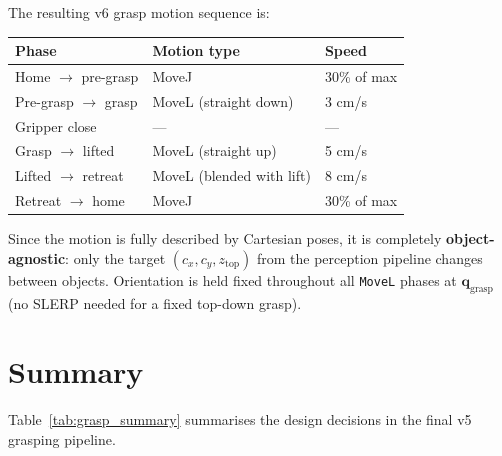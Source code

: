 The resulting v6 grasp motion sequence is:

\begin{center}
\begin{tabular}{lll}
\toprule
\textbf{Phase} & \textbf{Motion type} & \textbf{Speed} \\
\midrule
Home $\rightarrow$ pre-grasp  & MoveJ & 30\% of max \\
Pre-grasp $\rightarrow$ grasp & MoveL (straight down) & 3 cm/s \\
Gripper close                 & — & — \\
Grasp $\rightarrow$ lifted    & MoveL (straight up) & 5 cm/s \\
Lifted $\rightarrow$ retreat  & MoveL (blended with lift) & 8 cm/s \\
Retreat $\rightarrow$ home    & MoveJ & 30\% of max \\
\bottomrule
\end{tabular}
\end{center}

Since the motion is fully described by Cartesian poses, it is completely
\textbf{object-agnostic}: only the target $(c_x, c_y, z_{\text{top}})$ from the
perception pipeline changes between objects.
Orientation is held fixed throughout all \texttt{MoveL} phases at
$\mathbf{q}_{\text{grasp}}$ (no SLERP needed for a fixed top-down grasp).

\section{Summary}

Table~\ref{tab:grasp_summary} summarises the design decisions in the final v5
grasping pipeline.

